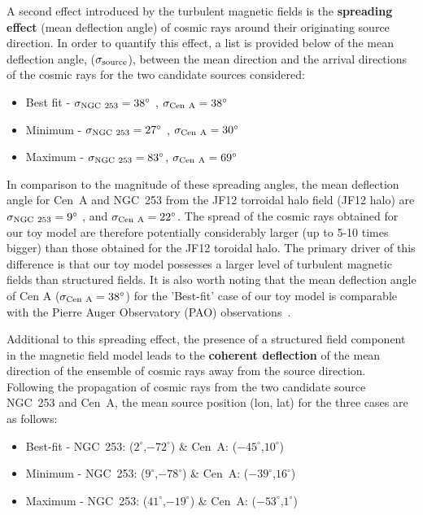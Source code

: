\documentclass[usenatbib]{mnras}
\begin{document}
A second effect introduced by the turbulent magnetic fields is the {\bf spreading effect} (mean deflection angle) of cosmic rays around their originating source direction. In order to quantify this effect, a list is provided below of the mean deflection angle, ($\sigma_{\rm source}$), between the mean direction and the arrival directions of the cosmic rays for the two candidate sources considered:
\begin{itemize}
        \item Best fit - $\sigma_{\rm NGC~253} = 38^{\circ}$ , {$\sigma_{\rm Cen~A} = 38^{\circ}$}
        \item Minimum - $\sigma_{\rm NGC~253} = 27^{\circ}$ , $\sigma_{\rm Cen~A} = 30^{\circ}$
        \item Maximum - $\sigma_{\rm NGC~253} = 83^{\circ}$, $\sigma_{\rm Cen~A} = 69^{\circ}$
\end{itemize}

In comparison to the magnitude of these spreading angles, the mean deflection angle for Cen~A and NGC~253 from the JF12 torroidal halo field (JF12 halo) \citep{JF12}  are  $\sigma_{\rm NGC~253} = 9^{\circ}$ , and {$\sigma_{\rm Cen~A} = 22^{\circ}$}.  The spread of the cosmic rays obtained for our toy model are therefore potentially considerably larger (up to 5-10 times bigger) than those obtained for the JF12 toroidal halo. The primary driver of this difference is that our toy model possesses a larger level of turbulent magnetic fields than structured fields. It is also worth noting that the mean deflection angle of Cen A ($\sigma_{\rm Cen~A} = 38^{\circ}$) for the 'Best-fit' case of our toy model is comparable with the Pierre Auger Observatory (PAO) observations~\citep{Auger_ICRC_2021}. 

Additional to this spreading effect, the presence of a structured field component in the magnetic field model leads to the {\bf coherent deflection} of the mean direction of the ensemble of cosmic rays away from the source direction. Following the propagation of cosmic rays from the two candidate source NGC~253 and Cen~A, the mean source position (lon, lat) for the three cases are as follows:
\begin{itemize}
    \item Best-fit - NGC~253: ($2^{\circ}$,$-72^{\circ}$) \& Cen~A: ($-45^{\circ}$,$10^{\circ}$) 
    \item Minimum - NGC~253: ($9^{\circ}$,$-78^{\circ}$) \& Cen~A: ($-39^{\circ}$,$16^{\circ}$) 
    \item Maximum - NGC~253: ($41^{\circ}$,$-19^{\circ}$) \& Cen~A: ($-53^{\circ}$,$1^{\circ}$) 
\end{itemize}
\end{document}
